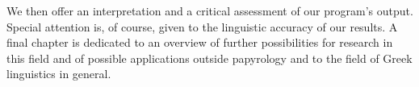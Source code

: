 We then offer an interpretation and a critical assessment of our
program's output. Special attention is, of course, given to the
linguistic accuracy of our results. A final chapter is dedicated to an
overview of further possibilities for research in this field and of
possible applications outside papyrology and to the field of Greek
linguistics in general.
